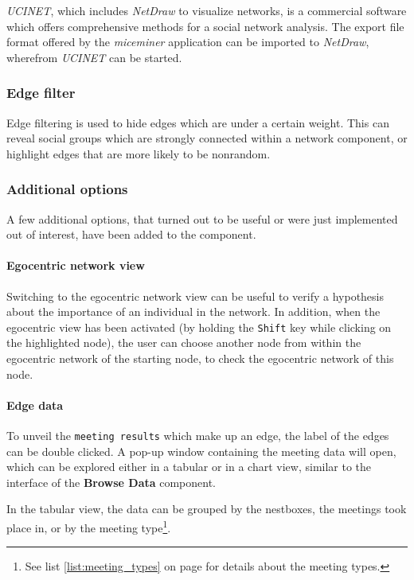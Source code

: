 \textit{UCINET}\cite{ucinet:99}, which includes \textit{NetDraw} to visualize networks, is a commercial software which offers comprehensive methods for a social network analysis. The export file format offered by the \textit{miceminer} application can be imported to \textit{NetDraw}, wherefrom \textit{UCINET} can be started.

\subsubsection*{Edge filter}

Edge filtering is used to hide edges which are under a certain weight. This can reveal social groups which are strongly connected within a network component, or highlight edges that are more likely to be nonrandom.

\subsubsection*{Additional options}

A few additional options, that turned out to be useful or were just implemented out of interest, have been added to the component.

\paragraph{Egocentric network view}

Switching to the egocentric network view can be useful to verify a hypothesis about the importance of an individual in the network. In addition, when the egocentric view has been activated (by holding the \lstinline|Shift| key while clicking on the highlighted node), the user can choose another node from within the egocentric network of the starting node, to check the egocentric network of this node.

\paragraph{Edge data}

To unveil the \lstinline|meeting results| which make up an edge, the label of the edges can be double clicked. A pop-up window containing the meeting data will open, which can be explored either in a tabular or in a chart view, similar to the interface of the \textbf{Browse Data} component.

In the tabular view, the data can be grouped by the nestboxes, the meetings took place in, or by the meeting type\footnote{See list \ref{list:meeting_types} on page \pageref{list:meeting_types} for details about the meeting types.}.

